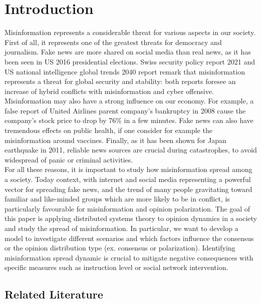 \section{Introduction}

Misinformation represents a considerable threat for various aspects in our society. First of all, it represents one of the greatest threats for democracy and journalism\cite{Zhou2019}. Fake news are more shared on social media than real news, as it has been seen in US 2016 presidential elections\cite{Zhou2020}. Swiss security policy report 2021\cite{swiss2021} and US national intelligence global trends 2040 report \cite{us2021} remark that misinformation represents a threat for global security and stability: both reports foresee an increase of hybrid conflicts with misinformation and cyber offensive. Misinformation may also have a strong influence on our economy. For example, a false report of United Airlines parent company's bankruptcy in 2008 cause the company's stock price to drop by 76$\%$ in a few minutes\cite{carvalho2011}. Fake news can also have tremendous effects on public health, if one consider for example the misinformation around vaccines\cite{Larson2017}. Finally, as it has been shown for Japan earthquake in 2011\cite{Hashimoto2021}, reliable news sources are crucial during catastrophes, to avoid widespread of panic or criminal activities.\\

For all these reasons, it is important to study how misinformation spread among a society. Today context, with internet and social media representing a powerful vector for spreading fake news, and the trend of many people gravitating toward familiar and like-minded groups which are more likely to be in conflict, is particularly favourable for misinformation and opinion polarization\cite{us2021}. The goal of this paper is applying distributed systems theory to opinion dynamics in a society and study the spread of misinformation. In particular, we want to develop a model to investigate different scenarios and which factors influence the consensus or the opinion distribution type (ex. consensus or polarization).
Identifying misinformation spread dynamic is crucial to mitigate negative consequences with specific measures such as instruction level\cite{joanna2017} or social network intervention\cite{mahak2020}.


\subsection{Related Literature}

